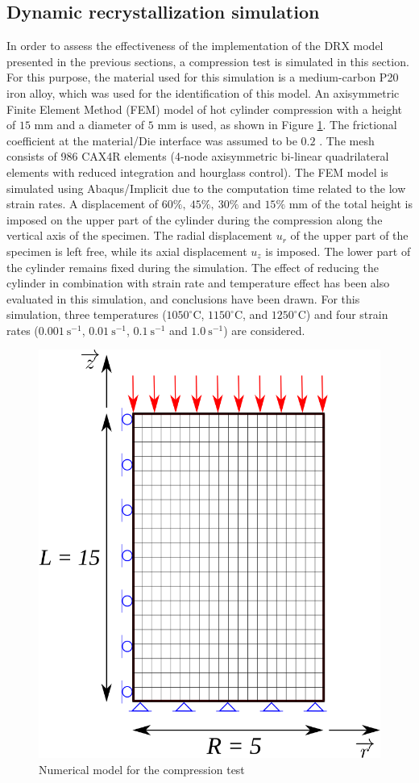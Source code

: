 \documentclass[metals,article,submit,pdftex,moreauthors]{Definitions/mdpi}
\begin{document}
\subsection{Dynamic recrystallization simulation\label{subsec:DRXSimulation}}
In order to assess the effectiveness of the implementation of the DRX model presented in the previous sections, a compression test is simulated in this section. For this purpose, the material used for this simulation is a medium-carbon P20 iron alloy, which was used for the identification of this model. An axisymmetric Finite Element Method (FEM) model of hot cylinder compression with a height of $15$ mm and a diameter of $5$ mm is used, as shown in Figure \ref{fig:Mesh}. The frictional coefficient at the material/Die interface was assumed to be $0.2$ \cite{zhang2019elevated,sun2020kinetique}. The mesh consists of 986 CAX4R elements (4-node axisymmetric bi-linear quadrilateral elements with reduced integration and hourglass control). The FEM model is simulated using Abaqus/Implicit due to the computation time related to the low strain rates. A displacement of $60\%, ~45\%, ~30\%$ and $15\%$ mm of the total height is imposed on the upper part of the cylinder during the compression along the vertical axis of the specimen. The radial displacement $u_r$ of the upper part of the specimen is left free, while its axial displacement $u_z$ is imposed. The lower part of the cylinder remains fixed during the simulation. The effect of reducing the cylinder in combination with strain rate and temperature effect has been also evaluated in this simulation, and conclusions have been drawn. For this simulation, three temperatures ($1050^\circ$C, $1150^\circ$C, and $1250^\circ$C) and four strain rates ($0.001~\text{s}^{-1}$, $0.01~\text{s}^{-1}$, $0.1~\text{s}^{-1}$ and $1.0~\text{s}^{-1}$) are considered.
\begin{figure}[H]
\includegraphics[width=0.6\columnwidth]{Figures/CyCompression2}
\caption{Numerical model for the compression test}
\label{fig:Mesh}
\end{figure}
\end{document}
